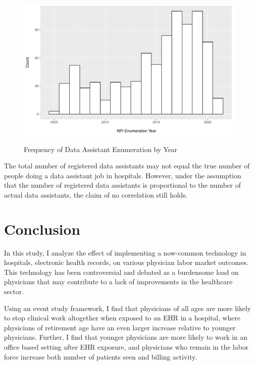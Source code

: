 \documentclass[11pt]{article}
\begin{document}
\vspace{5mm}
\begin{figure}[ht]
\centering
\caption{Frequency of Data Assistant Enumeration by Year}
\includegraphics[scale=.5]{Objects/dataassistant_histogram.pdf}
    \label{fig:dataassistant_histogram}
\end{figure}

The total number of registered data assistants may not equal the true number of people doing a data assistant job in hospitals. However, under the assumption that the number of registered data assistants is proportional to the number of actual data assistants, the claim of no correlation still holds. 

\section{Conclusion}

In this study, I analyze the effect of implementing a now-common technology in hospitals, electronic health records, on various physician labor market outcomes. This technology has been controversial and debated as a burdensome load on physicians that may contribute to a lack of improvements in the healthcare sector. 

Using an event study framework, I find that physicians of all ages are more likely to stop clinical work altogether when exposed to an EHR in a hospital, where physicians of retirement age have an even larger increase relative to younger physicians. Further, I find that younger physicians are more likely to work in an office based setting after EHR exposure, and physicians who remain in the labor force increase both number of patients seen and billing activity. 
\end{document}
